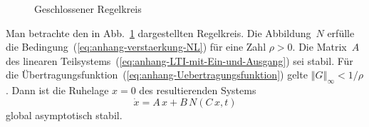 \begin{figure}
\begin{centering}

\par\end{centering}
\caption{Geschlossener Regelkreis\label{fig:Regelkreis-kleine-Kreisverstaerkung}}
\end{figure}

\begin{theorem}
\label{thm:Small-Gain-Theorem}Man
betrachte den in Abb.~\ref{fig:Regelkreis-kleine-Kreisverstaerkung}
dargestellten Regelkreis. Die Abbildung~$N$ erfülle die Bedingung~(\ref{eq:anhang-verstaerkung-NL})
für eine Zahl $\rho>0$. Die Matrix~$A$ des linearen Teil\-systems~(\ref{eq:anhang-LTI-mit-Ein-und-Ausgang})
sei stabil. Für die Übertragungsfunktion~(\ref{eq:anhang-Uebertragungsfunktion})
gelte $\left\Vert G\right\Vert _{\infty}<1/\rho$. Dann ist die Ruhelage
$x=0$ des resultierenden Systems
\begin{equation}
\dot{x}=A\,x+B\,N(C\,x,t)\label{eq:anhang-system-linear-nichtlinear}
\end{equation}
global asymptotisch stabil.
\end{theorem}
